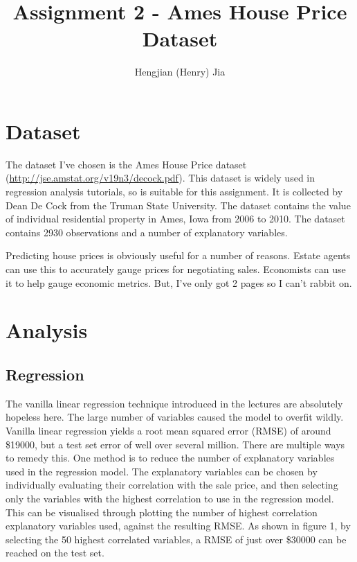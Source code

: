 \documentclass[10pt, letterpaper, twoside]{article}
\begin{document}
\title{Assignment 2 - Ames House Price Dataset}
\author{Hengjian (Henry) Jia}
\maketitle


\section{Dataset}

The dataset I've chosen is the Ames House Price dataset (\url{http://jse.amstat.org/v19n3/decock.pdf}). This dataset is widely used in regression analysis tutorials, so is suitable for this assignment. It is collected by Dean De Cock from the Truman State University. The dataset contains the value of individual residential property in Ames, Iowa  from 2006 to 2010. The dataset contains 2930 observations and a number of explanatory variables.

Predicting house prices is obviously useful for a number of reasons. Estate agents can use this to accurately gauge prices for negotiating sales. Economists can use it to help gauge economic metrics. But, I've only got 2 pages so I can't rabbit on.

\section{Analysis}

\subsection{Regression}
The vanilla linear regression technique introduced in the lectures are absolutely hopeless here. The large number of variables caused the model to overfit wildly. Vanilla linear regression yields a root mean squared error (RMSE) of around \$19000, but a test set error of well over several million. There are multiple ways to remedy this. One method is to reduce the number of explanatory variables used in the regression model. The explanatory variables can be chosen by individually evaluating their correlation with the sale price, and then selecting only the variables with the highest correlation to use in the regression model. This can be visualised through plotting the number of highest correlation explanatory variables used, against the resulting RMSE. As shown in figure 1, by selecting the 50 highest correlated variables, a RMSE of just over \$30000 can be reached on the test set.
\end{document}
